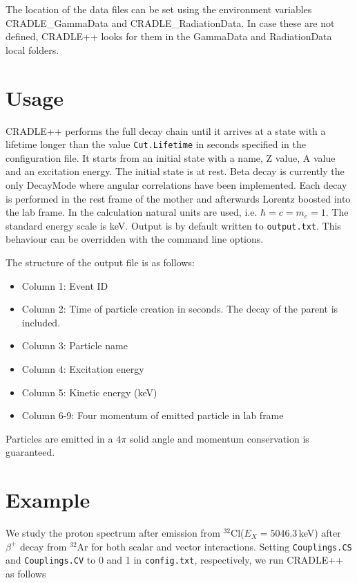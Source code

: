 \documentclass[11pt,a4paper]{article}
\theoremstyle{plain}
\theoremstyle{definition}
\theoremstyle{remark}
\begin{document}
The location of the data files can be set using the environment variables CRADLE\_GammaData and CRADLE\_RadiationData. In case these are not defined, CRADLE++ looks for them in the GammaData and RadiationData local folders.

\section{Usage}
CRADLE++ performs the full decay chain until it arrives at a state with a lifetime longer than the value {\tt Cut.Lifetime} in seconds specified in the configuration file. It starts from an initial state with a name, Z value, A value and an excitation energy. The initial state is at rest. Beta decay is currently the only DecayMode where angular correlations have been implemented. Each decay is performed in the rest frame of the mother and afterwards Lorentz boosted into the lab frame. In the calculation natural units are used, i.e. $\hbar=c=m_e=1$. The standard energy scale is keV. Output is by default written to {\tt output.txt}. This behaviour can be overridden with the command line options.
\vspace{10pt}

The structure of the output file is as follows:
\begin{itemize}
\item Column 1: Event ID
\item Column 2: Time of particle creation in seconds. The decay of the parent is included.
\item Column 3: Particle name
\item Column 4: Excitation energy
\item Column 5: Kinetic energy (keV)
\item Column 6-9: Four momentum of emitted particle in lab frame
\end{itemize}
Particles are emitted in a $4\pi$ solid angle and momentum conservation is guaranteed.

\section{Example}
We study the proton spectrum after emission from $^{32}$Cl($E_{X}=5046.3$\,keV) after $\beta^+$ decay from $^{32}$Ar for both scalar and vector interactions. Setting {\tt Couplings.CS} and {\tt Couplings.CV} to 0 and 1 in {\tt config.txt}, respectively, we run CRADLE++ as follows
\vspace{10pt}
\end{document}
